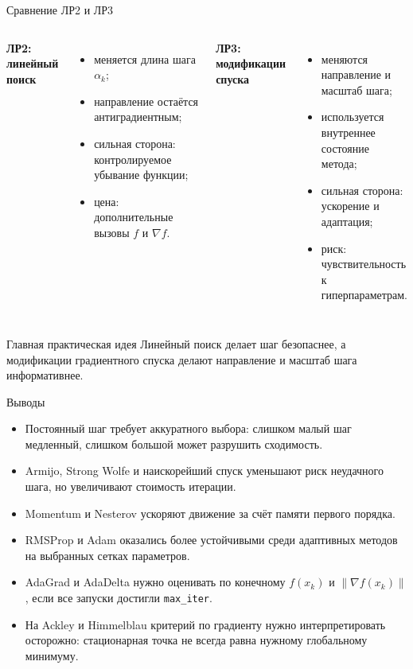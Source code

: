 ﻿\documentclass[10pt,aspectratio=169]{beamer}
\newcommand{\grad}{\nabla}
\newcommand{\norm}[1]{\left\lVert #1 \right\rVert}
\begin{document}
\begin{frame}{Сравнение ЛР2 и ЛР3}
\begin{columns}[T,onlytextwidth]
\textbf{ЛР2: линейный поиск}
\begin{itemize}
    \item меняется длина шага $\alpha_k$;
    \item направление остаётся антиградиентным;
    \item сильная сторона: контролируемое убывание функции;
    \item цена: дополнительные вызовы $f$ и $\grad f$.
\end{itemize}

\textbf{ЛР3: модификации спуска}
\begin{itemize}
    \item меняются направление и масштаб шага;
    \item используется внутреннее состояние метода;
    \item сильная сторона: ускорение и адаптация;
    \item риск: чувствительность к гиперпараметрам.
\end{itemize}
\end{columns}

\vspace{0.6em}
\begin{block}{Главная практическая идея}
Линейный поиск делает шаг безопаснее, а модификации градиентного спуска делают направление и масштаб шага информативнее.
\end{block}
\end{frame}

\begin{frame}{Выводы}
\begin{itemize}
    \item Постоянный шаг требует аккуратного выбора: слишком малый шаг медленный, слишком большой может разрушить сходимость.
    \item Armijo, Strong Wolfe и наискорейший спуск уменьшают риск неудачного шага, но увеличивают стоимость итерации.
    \item Momentum и Nesterov ускоряют движение за счёт памяти первого порядка.
    \item RMSProp и Adam оказались более устойчивыми среди адаптивных методов на выбранных сетках параметров.
    \item AdaGrad и AdaDelta нужно оценивать по конечному $f(x_k)$ и $\norm{\grad f(x_k)}$, если все запуски достигли \texttt{max\_iter}.
    \item На Ackley и Himmelblau критерий по градиенту нужно интерпретировать осторожно: стационарная точка не всегда равна нужному глобальному минимуму.
\end{itemize}
\end{frame}
\end{document}
